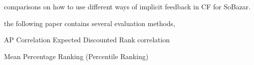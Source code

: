 




comparisons on how to use different ways of implicit feedback in CF for SoBazar.

the following paper contains several evaluation methods,

    AP Correlation
    Expected Discounted Rank correlation



Mean Percentage Ranking (Percentile Ranking)






